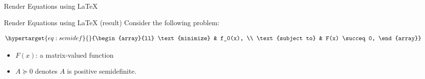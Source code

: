 \documentclass[
  10pt,
  ignorenonframetext,
  serif,onlymath]{beamer}
\newenvironment{Shaded}{}{}
\newcommand{\ExtensionTok}[1]{#1}
\newcommand{\KeywordTok}[1]{\textcolor[rgb]{0.00,0.44,0.13}{\textbf{#1}}}
\newcommand{\NormalTok}[1]{#1}
\newcommand{\SpecialCharTok}[1]{\textcolor[rgb]{0.25,0.44,0.63}{#1}}
\newcommand{\SpecialStringTok}[1]{\textcolor[rgb]{0.73,0.40,0.53}{#1}}
\providecommand{\tightlist}{%
  \setlength{\itemsep}{0pt}\setlength{\parskip}{0pt}}
\begin{document}
\begin{frame}[fragile]{Render Equations using LaTeX}
\protect\hypertarget{render-equations-using-latex}{}
\begin{Shaded}
\end{Shaded}
\end{frame}

\begin{frame}{Render Equations using LaTeX (result)}
\protect\hypertarget{render-equations-using-latex-result}{}
Consider the following problem:

\begin{equation}\protect\hypertarget{eq:semidef}{}{\begin{array}{ll}
  \text{minimize}    & f_0(x), \\
  \text{subject to}  & F(x) \succeq 0,
\end{array}}\label{eq:semidef}\end{equation}

\begin{itemize}
\tightlist
\item
  \(F(x)\): a matrix-valued function
\item
  \(A \succeq 0\) denotes \(A\) is positive semidefinite.
\end{itemize}
\end{frame}
\end{document}
